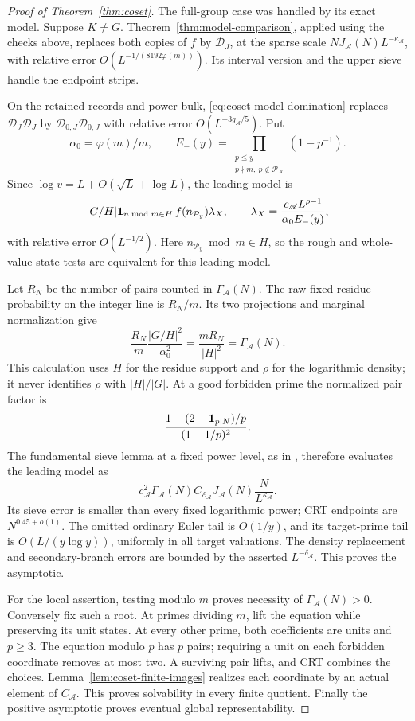 \begin{proof}[Proof of Theorem~\ref{thm:coset}]
The full-group case was handled by its exact model. Suppose \(K\ne G\).
Theorem~\ref{thm:model-comparison}, applied using the checks above,
replaces both copies of \(f\) by \(\mathcal D_J\), at the sparse scale
\(NJ_{\mathscr A}(N)L^{-\kappa_{\mathscr A}}\), with relative error
\(O(L^{-1/(8192\varphi(m))})\). Its interval version and the
upper sieve handle the endpoint strips.

On the retained records and power bulk,
\eqref{eq:coset-model-domination} replaces \(\mathcal D_J\mathcal D_J\) by
\(\mathcal D_{0,J}\mathcal D_{0,J}\) with relative error \(O(L^{-3g_{\mathscr A}/5})\).
Put
\[
 \alpha_0=\varphi(m)/m,\qquad
 E_-(y)=\prod_{\substack{p\le y\\p\nmid m,\ p\notin\mathcal P_{\mathscr A}}}
                        (1-p^{-1}).
\]
Since \(\log v=L+O(\sqrt L+\log L)\), the leading model is
\[
 |G/H|\mathbf 1_{n\bmod m\in H}\,f(n_{\mathcal P_y})\lambda_X,
 \qquad \lambda_X=\frac{c_{\mathscr A}L^{\rho-1}}{\alpha_0E_-(y)},
\]
with relative error \(O(L^{-1/2})\). Here
\(n_{\mathcal P_y}\bmod m\in H\), so the rough and whole-value
state tests are equivalent for this leading model.

Let \(R_N\) be the number of pairs counted in \(\Gamma_{\mathscr A}(N)\).
The raw fixed-residue probability on the integer line is \(R_N/m\).
Its two projections and marginal normalization give
\[
 \frac{R_N}{m}\frac{|G/H|^2}{\alpha_0^2}
              =\frac{mR_N}{|H|^2}=\Gamma_{\mathscr A}(N).
\]
This calculation uses \(H\) for the residue support and \(\rho\)
for the logarithmic density; it never identifies \(\rho\) with
\(|H|/|G|\).
At a good forbidden prime the normalized pair factor is
\[
 \frac{1-(2-\mathbf 1_{p\mid N})/p}{(1-1/p)^2}.
\]
The fundamental sieve lemma at a fixed power level, as in
\cite[Theorem 11.7]{richert}, therefore evaluates the leading model
as
\[
 c_{\mathscr A}^2\Gamma_{\mathscr A}(N)C_{\mathcal E_{\mathscr A}}J_{\mathscr A}(N)
                       \frac{N}{L^{\kappa_{\mathscr A}}}.
\]
Its sieve error is smaller than every fixed logarithmic power;
CRT endpoints are \(N^{0.45+o(1)}\). The omitted ordinary Euler
tail is \(O(1/y)\), and its target-prime tail is
\(O(L/(y\log y))\), uniformly in all target valuations.
The density replacement and secondary-branch errors are bounded
by the asserted \(L^{-\delta_{\mathscr A}}\). This proves the asymptotic.

For the local assertion, testing modulo \(m\) proves necessity of
\(\Gamma_{\mathscr A}(N)>0\). Conversely fix such a root. At primes dividing
\(m\), lift the equation while preserving its unit states.
At every other prime, both coefficients are units and \(p\ge3\).
The equation modulo \(p\) has \(p\) pairs; requiring a unit on
each forbidden coordinate removes at most two. A surviving pair
lifts, and CRT combines the choices. Lemma~\ref{lem:coset-finite-images}
realizes each coordinate by an actual element of \(C_{\mathscr A}\).
This proves solvability in every finite quotient. Finally the
positive asymptotic proves eventual global representability.
\end{proof}


